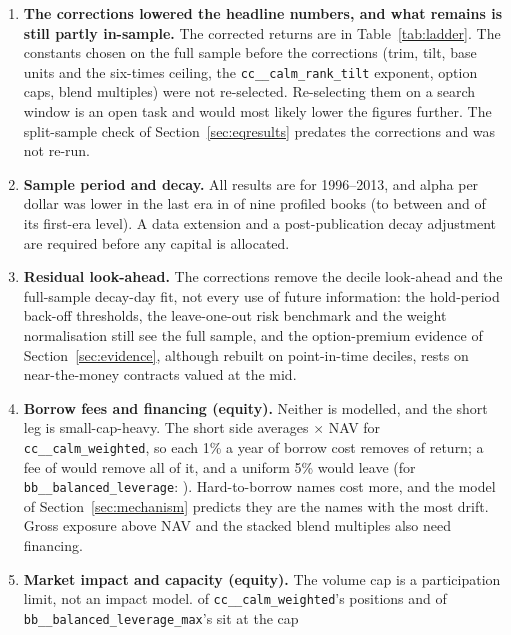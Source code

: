 \documentclass[11pt]{article}
\makeatletter
\theoremstyle{definition}
\newcommand{\1}{\mathbf{1}}
\newcommand{\sn}[1]{\texttt{\sn@scan#1\@nil}}
\def\sn@scan#1{\ifx#1\@nil\else\ifx#1_\_\allowbreak\else#1\fi\expandafter\sn@scan\fi}
\makeatother
\begin{document}
\begin{enumerate}
\item \textbf{The corrections lowered the headline numbers, and what remains is still partly in-sample.} The corrected returns are in Table~\ref{tab:ladder}. The constants chosen on the full sample before the corrections (trim, tilt, base units and the six-times ceiling, the
      \sn{calm_rank_tilt} exponent, option caps, blend multiples) were not re-selected. Re-selecting them on a search window is an open task and would most likely lower the figures further. The split-sample check of Section~\ref{sec:eqresults} predates the corrections and was not re-run.
\item \textbf{Sample period and decay.} All results are for 1996--2013, and alpha per dollar was lower in the last era in  of nine profiled books (to between  and  of its first-era level). A data extension and a post-publication
      decay adjustment \citep{McLeanPontiff2016} are required before any capital is allocated.
\item \textbf{Residual look-ahead.} The corrections remove the decile look-ahead and the full-sample decay-day fit, not every use of future information: the hold-period back-off thresholds, the leave-one-out risk benchmark and the weight normalisation still see the full sample, and the
      option-premium evidence of Section~\ref{sec:evidence}, although rebuilt on point-in-time deciles, rests on near-the-money contracts valued at the mid.
\item \textbf{Borrow fees and financing (equity).} Neither is modelled, and the short leg is small-cap-heavy. The short side averages $\times$ NAV for \sn{calm_weighted}, so each 1\% a year of borrow cost removes  of
      return; a fee of  would remove all of it, and a uniform 5\% would leave  (for \sn{balanced_leverage}: ). Hard-to-borrow names cost more, and the model of
      Section~\ref{sec:mechanism} predicts they are the names with the most drift. Gross exposure above NAV and the stacked blend multiples also need financing.
\item \textbf{Market impact and capacity (equity).} The  volume cap is a participation limit, not an impact model.  of \sn{calm_weighted}'s positions and  of \sn{balanced_leverage_max}'s sit at the cap

\end{enumerate}
\end{document}
